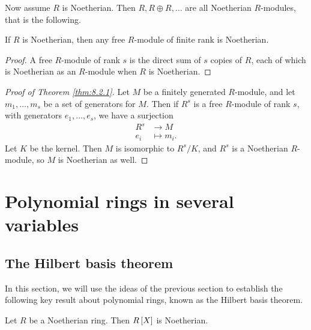 Now assume $ R $ is Noetherian. Then $ R, R \oplus R, \dots $ are all Noetherian $ R $-modules, that is the following.

\begin{corollary}
If $ R $ is Noetherian, then any free $ R $-module of finite rank is Noetherian.
\end{corollary}

\begin{proof}
A free $ R $-module of rank $ s $ is the direct sum of $ s $ copies of $ R $, each of which is Noetherian as an $ R $-module when $ R $ is Noetherian.
\end{proof}

\begin{proof}[Proof of Theorem \ref{thm:8.2.1}]
Let $ M $ be a finitely generated $ R $-module, and let $ m_1, \dots, m_s $ be a set of generators for $ M $. Then if $ R^s $ is a free $ R $-module of rank $ s $, with generators $ e_1, \dots, e_s $, we have a surjection
\begin{align*}
R^s & \to M \\
e_i & \mapsto m_i.
\end{align*}
Let $ K $ be the kernel. Then $ M $ is isomorphic to $ R^s / K $, and $ R^s $ is a Noetherian $ R $-module, so $ M $ is Noetherian as well.
\end{proof}

\pagebreak

\section{Polynomial rings in several variables}

\subsection{The Hilbert basis theorem}

In this section, we will use the ideas of the previous section to establish the following key result about polynomial rings, known as the Hilbert basis theorem.

\begin{theorem}
\label{thm:9.1.1}
Let $ R $ be a Noetherian ring. Then $ R\sb{X} $ is Noetherian.
\end{theorem}


